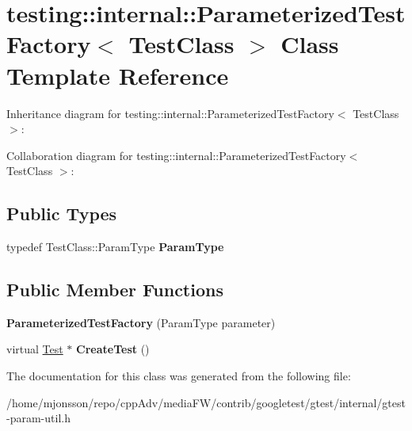 \hypertarget{classtesting_1_1internal_1_1ParameterizedTestFactory}{}\section{testing\+:\+:internal\+:\+:Parameterized\+Test\+Factory$<$ Test\+Class $>$ Class Template Reference}
\label{classtesting_1_1internal_1_1ParameterizedTestFactory}


Inheritance diagram for testing\+:\+:internal\+:\+:Parameterized\+Test\+Factory$<$ Test\+Class $>$\+:


Collaboration diagram for testing\+:\+:internal\+:\+:Parameterized\+Test\+Factory$<$ Test\+Class $>$\+:
\subsection*{Public Types}
\begin{DoxyCompactItemize}
\item 
\mbox{\label{classtesting_1_1internal_1_1ParameterizedTestFactory_ad9a27b8e1a83de2f1687625bccff460d}} 
typedef Test\+Class\+::\+Param\+Type {\bfseries Param\+Type}
\end{DoxyCompactItemize}
\subsection*{Public Member Functions}
\begin{DoxyCompactItemize}
\item 
\mbox{\label{classtesting_1_1internal_1_1ParameterizedTestFactory_a82d78356cd402224255edec760a048fb}} 
{\bfseries Parameterized\+Test\+Factory} (Param\+Type parameter)
\item 
\mbox{\label{classtesting_1_1internal_1_1ParameterizedTestFactory_ae17e73e91f7fd5d49ca238c005ef4960}} 
virtual \hyperlink{classtesting_1_1Test}{Test} $\ast$ {\bfseries Create\+Test} ()
\end{DoxyCompactItemize}


The documentation for this class was generated from the following file\+:\begin{DoxyCompactItemize}
\item 
/home/mjonsson/repo/cpp\+Adv/media\+F\+W/contrib/googletest/gtest/internal/gtest-\/param-\/util.\+h\end{DoxyCompactItemize}
